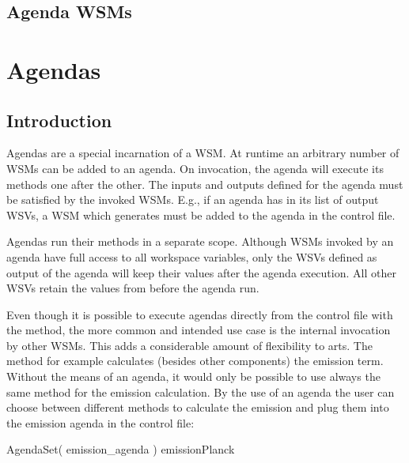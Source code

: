\subsection{Agenda WSMs}

\section{Agendas}
\label{sec:agendas:agendas}

\subsection{Introduction}
Agendas are a special incarnation of a WSM. At runtime an arbitrary
number of WSMs can be added to an agenda. On invocation, the agenda
will execute its methods one after the other. The inputs and outputs
defined for the agenda must be satisfied by the invoked WSMs. E.g., if
an agenda has  in its list of output WSVs, a WSM
which generates  must be added to the agenda in the
control file.

Agendas run their methods in a separate scope. Although WSMs invoked by
an agenda have full access to all workspace variables, only the WSVs
defined as output of the agenda will keep their values after the agenda
execution. All other WSVs retain the values from before the agenda
run.

Even though it is possible to execute agendas directly from the control
file with the  method, the more common and
intended use case is the internal invocation by other WSMs. This adds a
considerable amount of flexibility to arts.
The  method for example calculates
(besides other components) the emission term. Without the means of an agenda,
it would only be possible to use always the same method for the emission
calculation. By the use of an agenda the user can choose between different
methods to calculate the emission and plug them into the emission agenda in
the control file:

\begin{code}
AgendaSet( emission_agenda ){
  emissionPlanck
}
\end{code}





